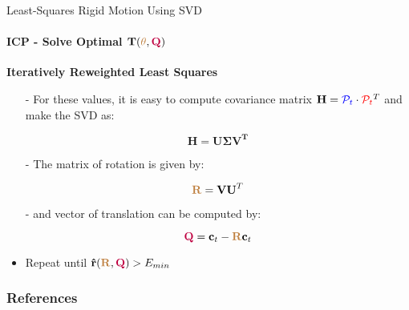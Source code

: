 \documentclass[aspectratio=169]{beamer}
\newcommand{\tikzRot}{0}
\newcommand{\tikzTrans}{(0,0)}
\newcommand{\tikzShowrobot}{0}
\newcommand{\tikzOneCenter}{0}
\begin{document}
\begin{frame}[fragile, c]{Least-Squares Rigid Motion Using SVD}
	\framesubtitle{ICP - Solve Optimal $\mathbf{T}(\textcolor{brown}{\theta}, \textcolor{purple}{\mathbf{Q}})$}
	\textbf{Iteratively Reweighted Least Squares}

	\begin{minipage}[t]{0.5\textwidth}
			\begin{figure}
				\resizebox{0.7\textwidth}{!}{
					\renewcommand{\tikzRot}{30}
					\renewcommand{\tikzTrans}{(8,0)}
					\renewcommand{\tikzShowrobot}{0}
					\renewcommand{\tikzOneCenter}{0}
					\resizebox{0.8\textwidth}{!}{
					}
				}
		\end{figure}
	\end{minipage}
	\begin{minipage}[t]{0.5\textwidth}

	\vspace{-0.2in}
	\begin{itemize}
		\item[-] For these values, it is easy to compute covariance matrix $\mathbf{H} = \textcolor{blue}{\mathcal{P}_{t}} \cdot \textcolor{red}{\mathcal{P}_{t}}^T $ and make the SVD as:

	\vspace{-0.2in}
	\begin{equation*}
		\mathbf{H} = \mathbf{U \Sigma V^T}
	\end{equation*}

	\item[-] The matrix of rotation is given by:

	\vspace{-0.2in}
	\begin{equation*}
		\textcolor{brown}{\mathbf{R}} = \mathbf{V U}^T
	\end{equation*}

	\item[-] and vector of translation can be computed by:

	\vspace{-0.2in}
	\begin{equation*}
		\textcolor{purple}{\mathbf{Q}} = {\mathbf{c}_{t}} - \textcolor{brown}{\mathbf{R}} {\mathbf{c}_{t}}
	\end{equation*}

	\item Repeat until $\mathbf{\hat{r}}(\textcolor{brown}{\mathbf{R}}, \textcolor{purple}{\mathbf{Q}}) > E_{min}$

	\end{itemize}
	\end{minipage}
\end{frame}


 
\begin{frame}[t, allowframebreaks]
	\frametitle{References}
	
\end{frame}
\end{document}

